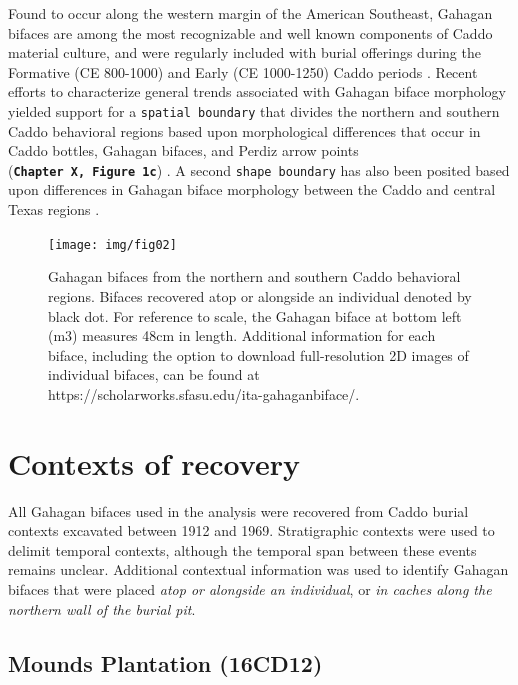 \documentclass[]{interact}
\theoremstyle{plain}%
\theoremstyle{definition}
\theoremstyle{remark}
\begin{document}
Found to occur along the western margin of the American Southeast,
Gahagan bifaces are among the most recognizable and well known
components of Caddo material culture, and were regularly included with
burial offerings during the Formative (CE 800-1000) and Early (CE
1000-1250) Caddo periods
\citep{RN7115,RN8189,RN5746,RN8186,RN8174,RN8176}. Recent efforts to
characterize general trends associated with Gahagan biface morphology
yielded support for a \texttt{spatial\ boundary} that divides the
northern and southern Caddo behavioral regions based upon morphological
differences that occur in Caddo bottles, Gahagan bifaces, and Perdiz
arrow points (\textbf{\texttt{Chapter\ X,\ Figure\ 1c}})
\citep{RN7925,RN8071,RN8361,RN8967,RN11064,RN8154}. A second
\texttt{shape\ boundary} has also been posited based upon differences in
Gahagan biface morphology between the Caddo and central Texas regions
\citep{RN8318}.

\begin{figure}

{\centering \texttt{[image: img/fig02]} 

}

\caption{Gahagan bifaces from the northern and southern Caddo behavioral regions. Bifaces recovered atop or alongside an individual denoted by black dot. For reference to scale, the Gahagan biface at bottom left (m3) measures 48cm in length. Additional information for each biface, including the option to download full-resolution 2D images of individual bifaces, can be found at https://scholarworks.sfasu.edu/ita-gahaganbiface/.}\label{fig:gahagan bifaces 2D}
\end{figure}

\hypertarget{contexts-of-recovery}{%
\section{Contexts of recovery}\label{contexts-of-recovery}}

All Gahagan bifaces used in the analysis were recovered from Caddo
burial contexts excavated between 1912 and 1969. Stratigraphic contexts
were used to delimit temporal contexts, although the temporal span
between these events remains unclear. Additional contextual information
was used to identify Gahagan bifaces that were placed \emph{atop or
alongside an individual}, or \emph{in caches along the northern wall of
the burial pit}.

\hypertarget{mounds-plantation-16cd12}{%
\subsection{Mounds Plantation (16CD12)}\label{mounds-plantation-16cd12}}
\end{document}
